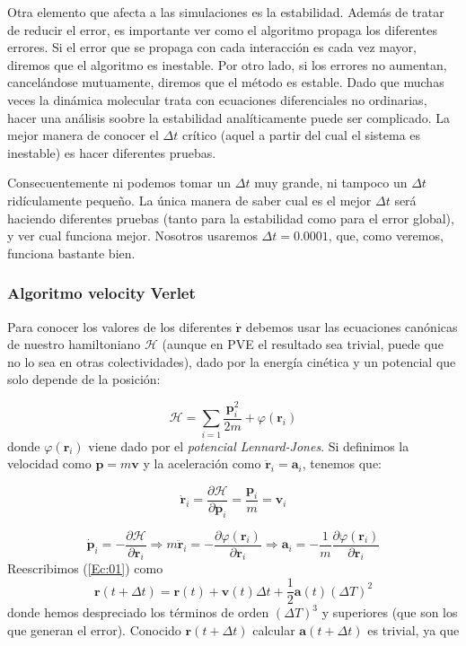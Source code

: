 \documentclass[11pt]{article} %
\newcommand{\parciales}[2]{\frac{\partial #1}{\partial #2}}
\newcommand{\Hcal}{\mathcal{H}}
\newcommand{\an}{\mathbf{a}}
\newcommand{\pn}{\mathbf{p}}
\newcommand{\rn}{\mathbf{r}}
\newcommand{\vn}{\mathbf{v}}
\begin{document}
Otra elemento que afecta a las simulaciones es la estabilidad. Además de tratar de reducir el error, es importante ver como el algoritmo propaga los diferentes errores. Si el error que se propaga con cada interacción es cada vez mayor, diremos que el algoritmo es inestable. Por otro lado, si los errores no aumentan, cancelándose mutuamente, diremos que el método es estable. Dado que muchas veces la dinámica molecular trata con ecuaciones diferenciales no ordinarias, hacer una análisis soobre la estabilidad analíticamente puede ser complicado. La mejor manera de conocer el $\Delta t$ crítico (aquel a partir del cual el sistema es inestable) es hacer diferentes pruebas. 

Consecuentemente ni podemos tomar un $\Delta t$ muy grande, ni tampoco un $\Delta t$ ridículamente pequeño. La única manera de saber cual es el mejor $\Delta t$ será haciendo diferentes pruebas (tanto para la estabilidad como para el error global), y ver cual funciona mejor. Nosotros usaremos $\Delta t = 0.0001$, que, como veremos, funciona bastante bien.  \\



\subsubsection{Algoritmo velocity Verlet} \label{Subsec:03-02}

Para conocer los valores de los diferentes $\dot{\rn}$ debemos usar las ecuaciones canónicas de nuestro hamiltoniano $\Hcal$ (aunque en PVE el resultado sea trivial, puede que no lo sea en otras colectividades), dado por la energía cinética y un potencial que solo depende de la posición:

\begin{equation}
	\Hcal = \sum_{i=1} \frac{\pn_i^2}{2m} + \varphi (\rn_i)
\end{equation}
donde $\varphi(\rn_i)$ viene dado por el \textit{potencial Lennard-Jones}. Si definimos la velocidad como $\pn=m\vn$ y la aceleración como $\ddot{\rn}_i = \an_i$, tenemos que:

\begin{equation}
	\dot{\rn}_i = \parciales{\Hcal}{\pn_i} = \frac{\pn_i}{m} = \vn_i
\end{equation}

\begin{equation}
	\dot{\pn}_i = - \parciales{\Hcal}{\rn_i} \Rightarrow  m \ddot{\rn}_i = - \parciales{\varphi(\rn_i)}{\rn_i} \Rightarrow \an_i =  - \frac{1}{m} \parciales{\varphi(\rn_i)}{\rn_i}
\end{equation}
Reescribimos (\ref{Ec:01}) como
\begin{equation}
	\rn(t+\Delta t) = \rn(t) + \vn(t) \Delta t + \frac{1}{2} \an (t) (\Delta T)^2
\end{equation}
donde hemos despreciado los términos de orden $(\Delta T)^3$ y superiores (que son los que generan el error). Conocido  $\rn(t+\Delta t)$ calcular $\an(t+\Delta t)$ es trivial, ya que 
\end{document}
